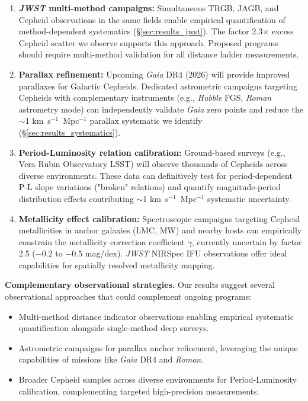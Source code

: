 \documentclass[preprint, linenumbers]{aastex701}
\begin{document}
\begin{enumerate}
\item \textbf{\textit{JWST} multi-method campaigns:} Simultaneous TRGB, JAGB, and Cepheid observations in the same fields enable empirical quantification of method-dependent systematics (\S\ref{sec:results_jwst}). The factor 2.3$\times$ excess Cepheid scatter we observe supports this approach. Proposed programs should require multi-method validation for all distance ladder measurements.

\item \textbf{Parallax refinement:} Upcoming \textit{Gaia} DR4 (2026) will provide improved parallaxes for Galactic Cepheids. Dedicated astrometric campaigns targeting Cepheids with complementary instruments (e.g., \textit{Hubble} FGS, \textit{Roman} astrometry mode) can independently validate \textit{Gaia} zero points and reduce the $\sim$1 km~s$^{-1}$~Mpc$^{-1}$ parallax systematic we identify (\S\ref{sec:results_systematics}).

\item \textbf{Period-Luminosity relation calibration:} Ground-based surveys (e.g., Vera Rubin Observatory LSST) will observe thousands of Cepheids across diverse environments. These data can definitively test for period-dependent P-L slope variations ("broken" relations) and quantify magnitude-period distribution effects contributing $\sim$1 km~s$^{-1}$~Mpc$^{-1}$ systematic uncertainty.

\item \textbf{Metallicity effect calibration:} Spectroscopic campaigns targeting Cepheid metallicities in anchor galaxies (LMC, MW) and nearby hosts can empirically constrain the metallicity correction coefficient $\gamma$, currently uncertain by factor 2.5 ($-0.2$ to $-0.5$ mag/dex). \textit{JWST} NIRSpec IFU observations offer ideal capabilities for spatially resolved metallicity mapping.
\end{enumerate}

\textbf{Complementary observational strategies.} Our results suggest several observational approaches that could complement ongoing programs:
\begin{itemize}
\item Multi-method distance indicator observations enabling empirical systematic quantification alongside single-method deep surveys.
\item Astrometric campaigns for parallax anchor refinement, leveraging the unique capabilities of missions like \textit{Gaia} DR4 and \textit{Roman}.
\item Broader Cepheid samples across diverse environments for Period-Luminosity calibration, complementing targeted high-precision measurements.
\end{itemize}
\end{document}
